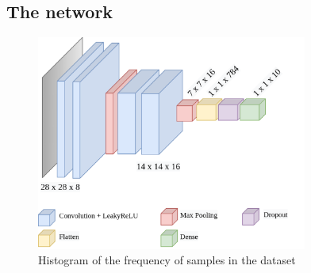 \documentclass[compsoc]{IEEEtran}
\begin{document}
\subsection{The network}

\begin{figure}[ht!]
\centering                                                                        
\includegraphics[width=3.5in]{cnn.png}
\captionsetup{justification=centering}                                                                                         
\caption{Histogram of the frequency of samples in the dataset}
\label{fig:cnn}                                                                                                                               
\end{figure}
\end{document}
